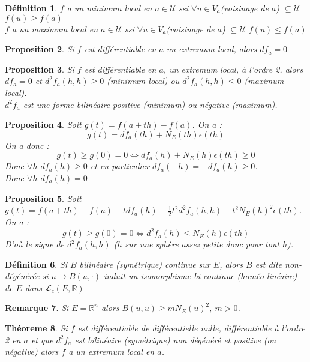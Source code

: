 \documentclass[a4paper, oneside]{report}
\theoremstyle{break}
\newtheorem{thm}{Théoreme}[section] %
\newtheorem{defi}[thm]{Définition}
\newtheorem{propo}[thm]{Proposition}
\newtheorem{remar}[thm]{Remarque}
\newcommand{\R}{\mathbb{R}}
\newcommand{\U}{\mathcal{U}}
\renewcommand{\L}{\mathcal{L}}
\newcommand{\fracun}[1]{\frac{1}{#1}}
\begin{document}
\begin{defi}
$f$ a un minimum local en $a \in \U$ ssi $\forall u \in V_a$(voisinage de $a$) $\subseteq \U$ $f(u) \geq f(a)$\\
$f$ a un maximum local en $a \in \U$ ssi $\forall u \in V_a$(voisinage de $a$) $\subseteq \U$ $f(u) \leq f(a)$
\end{defi}

\begin{propo}
Si $f$ est différentiable en $a$ un extremum local, alors $df_a=0$
\end{propo}

\begin{propo}
Si $f$ est différentiable en $a$, un extremum local, à l'ordre 2, alors $df_a = 0$ et $d^2f_a(h,h) \geq 0$ (minimum local) ou $d^2f_a(h,h) \leq 0$ (maximum local).\\
$d^2f_a$ est une forme bilinéaire positive (minimum) ou négative (maximum).
\end{propo}

\begin{propo}
Soit $g(t)=f(a+th)-f(a)$. On a :
$$g(t)=df_a(th)+N_E(th)\epsilon (th)$$
On a donc :
$$g(t)\geq g(0)=0 \Leftrightarrow df_a(h)+N_E(h)\epsilon(th)\geq 0$$
Donc $\forall h$ $df_a(h)\geq 0$ et en particulier $df_a(-h)=-df_a(h)\geq 0$.\\
Donc $\forall h$ $df_a(h)=0$
\end{propo}

\begin{propo}
Soit $g(t)=f(a+th)-f(a)-tdf_a(h)-\fracun{2}t^2d^2f_a(h,h)-t^2N_E(h)^2\epsilon (th)$. On a :
$$g(t)\geq g(0)=0 \Leftrightarrow d^2f_a(h)\leq N_E(h)\epsilon(th)$$
D'où le signe de $d^2f_a(h,h)$ ($h$ sur une sphère assez petite donc pour tout $h$).
\end{propo}

\begin{defi}
Si $B$ bilinéaire (symétrique) continue sur $E$, alors $B$ est dite non-dégénérée si $u\mapsto B(u,\cdot)$ induit un isomorphisme bi-continue (homéo-linéaire) de $E$ dans $\L_c(E,\R)$
\end{defi}

\begin{remar}
Si $E=\R^n$ alors $B(u,u)\geq mN_E(u)^2,~m>0$.
\end{remar}

\begin{thm}
Si $f$ est différentiable de différentielle nulle, différentiable à l'ordre 2 en $a$ et que $d^2f_a$ est bilinéaire (symétrique) non dégénéré et positive (ou négative) alors $f$ a un extremum local en $a$.
\end{thm}
\end{document}
